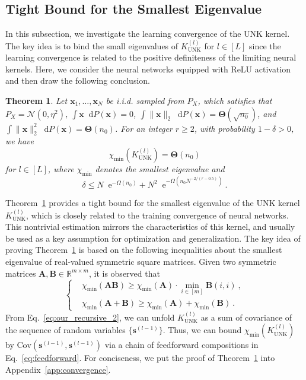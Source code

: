 \documentclass[review,10pt]{JMtemplate}
\newcommand*{\dif}{\mathop{}\!\mathrm{d}}
\newcommand*{\e}{\mathop{}\!\mathrm{e}}
\newtheorem{theorem}{Theorem}
\begin{document}
\subsection{Tight Bound for the Smallest Eigenvalue}
In this subsection, we investigate the learning convergence of the UNK kernel. The key idea is to bind the small eigenvalues of $K_{\textrm{UNK}}^{(l)}$ for $l\in[L]$ since the learning convergence is related to the positive definiteness of the limiting neural kernels. Here, we consider the neural networks equipped with ReLU activation and then draw the following conclusion.
\begin{theorem} \label{thm:smallest}
Let $\boldsymbol{x}_1, \dots, \boldsymbol{x}_N$ be i.i.d. sampled from $P_X$, which satisfies that $P_X = \mathcal{N}(0,\eta^2)$, $\int \boldsymbol{x} \dif P\left(\boldsymbol{x}\right) = 0$, $\int\|\boldsymbol{x}\|_{2} \dif P(\boldsymbol{x}) = \mathbf{\Theta}(\sqrt{n_0})$, and $\int\|\boldsymbol{x}\|_{2}^{2} \dif P(\boldsymbol{x}) = \mathbf{\Theta}(n_0)$. For an integer $r \geq 2$, with probability $1-\delta>0$, we have
\[
\chi_{\min} \left( K_{\textrm{UNK}}^{(l)}  \right) = \mathbf{\Theta}(n_0)
\]
for $l \in [L]$, where $\chi_{\min}$ denotes the smallest eigenvalue and
\[
\delta \leq N \e^{-\Omega(n_0)} + N^2 \e^{ -\Omega(n_0 N^{-2 /(r-0.5)}) } \ .
\]
\end{theorem}
Theorem~\ref{thm:smallest} provides a tight bound for the smallest eigenvalue of the UNK kernel $K_{\textrm{UNK}}^{(l)}$, which is closely related to the training convergence of neural networks. This nontrivial estimation mirrors the characteristics of this kernel, and usually be used as a key assumption for optimization and generalization. The key idea of proving Theorem~\ref{thm:smallest} is based on the following inequalities about the smallest eigenvalue of real-valued symmetric square matrices. Given two symmetric matrices $\mathbf{A}, \mathbf{B}\in\mathbb{R}^{m \times m}$, it is observed that
\begin{equation} \label{eq:lamda_eigenvalues}
	\left\{\begin{aligned}
		&\chi_{\min}(\mathbf{A}\mathbf{B}) \geq \chi_{\min}(\mathbf{A}) \cdot \min_{i\in[m]} \mathbf{B}(i,i) \ , \\
		&\chi_{\min}(\mathbf{A}+\mathbf{B}) \geq \chi_{\min}(\mathbf{A}) + \chi_{\min}(\mathbf{B}) \ .
	\end{aligned} \right.
\end{equation}
From Eq.~\eqref{eq:our_recursive_2}, we can unfold $K_{\textrm{UNK}}^{(l)}$ as a sum of covariance of the sequence of random variables $\{\boldsymbol{s}^{(l-1)}\}$. Thus, we can bound $\chi_{\min} ( K_{\textrm{UNK}}^{(l)} )$ by $\mathrm{Cov}(\boldsymbol{s}^{(l-1)},\boldsymbol{s}^{(l-1)})$ via a chain of feedforward compositions in Eq.~\eqref{eq:feedforward}. For conciseness, we put the proof of Theorem~\ref{thm:smallest} into Appendix~\ref{app:convergence}.
\end{document}
